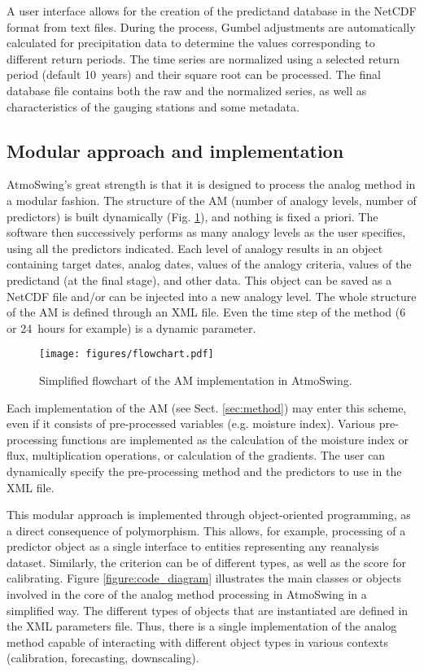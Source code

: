 \documentclass[review]{elsarticle}
\begin{document}
A user interface allows for the creation of the predictand database in the NetCDF format from text files. During the process, Gumbel adjustments are automatically calculated for precipitation data to determine the values corresponding to different return periods. The time series are normalized using a selected return period (default 10~years) and their square root can be processed. The final database file contains both the raw and the normalized series, as well as characteristics of the gauging stations and some metadata.


\subsection{Modular approach and implementation}

AtmoSwing's great strength is that it is designed to process the analog method in a modular fashion. The structure of the AM (number of analogy levels, number of predictors) is built dynamically (Fig. \ref{figure:flowchart_modules_atmoswing}), and nothing is fixed a priori. The software then successively performs as many analogy levels as the user specifies, using all the predictors indicated. Each level of analogy results in an object containing target dates, analog dates, values of the analogy criteria, values of the predictand (at the final stage), and other data. This object can be saved as a NetCDF file and/or can be injected into a new analogy level. The whole structure of the AM is defined through an XML file. Even the time step of the method (6 or 24~hours for example) is a dynamic parameter.

\begin{figure}[hbt!]
	\texttt{[image: figures/flowchart.pdf]}
	\caption{Simplified flowchart of the AM implementation in AtmoSwing.}
	\label{figure:flowchart_modules_atmoswing}
\end{figure}

Each implementation of the AM (see Sect. \ref{sec:method}) may enter this scheme, even if it consists of pre-processed variables (e.g. moisture index). Various pre-processing functions are implemented as the calculation of the moisture index or flux, multiplication operations, or calculation of the gradients. The user can dynamically specify the pre-processing method and the predictors to use in the XML file.

This modular approach is implemented through object-oriented programming, as a direct consequence of polymorphism. This allows, for example, processing of a predictor object as a single interface to entities representing any reanalysis dataset. Similarly, the criterion can be of different types, as well as the score for calibrating. Figure \ref{figure:code_diagram} illustrates the main classes or objects involved in the core of the analog method processing in AtmoSwing in a simplified way. The different types of objects that are instantiated are defined in the XML parameters file. Thus, there is a single implementation of the analog method capable of interacting with different object types in various contexts (calibration, forecasting, downscaling). 
\end{document}
